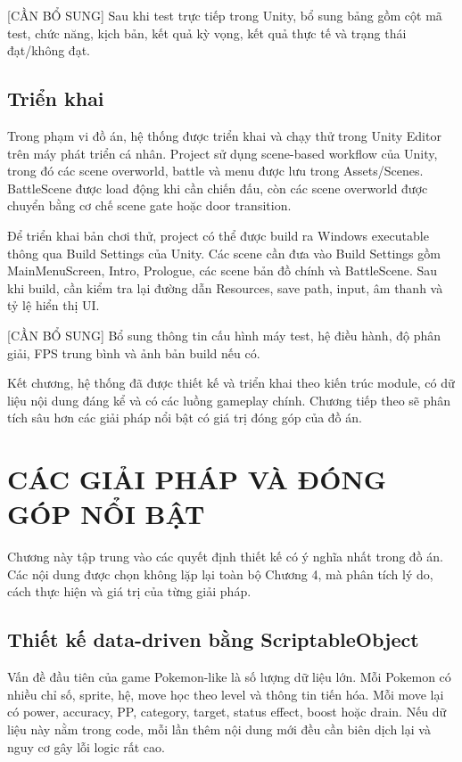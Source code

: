 [CẦN BỔ SUNG] Sau khi test trực tiếp trong Unity, bổ sung bảng gồm cột mã test, chức năng, kịch bản, kết quả kỳ vọng, kết quả thực tế và trạng thái đạt/không đạt.

\section{Triển khai}

Trong phạm vi đồ án, hệ thống được triển khai và chạy thử trong Unity Editor trên máy phát triển cá nhân. Project sử dụng scene-based workflow của Unity, trong đó các scene overworld, battle và menu được lưu trong Assets/Scenes. BattleScene được load động khi cần chiến đấu, còn các scene overworld được chuyển bằng cơ chế scene gate hoặc door transition.

Để triển khai bản chơi thử, project có thể được build ra Windows executable thông qua Build Settings của Unity. Các scene cần đưa vào Build Settings gồm MainMenuScreen, Intro, Prologue, các scene bản đồ chính và BattleScene. Sau khi build, cần kiểm tra lại đường dẫn Resources, save path, input, âm thanh và tỷ lệ hiển thị UI.

[CẦN BỔ SUNG] Bổ sung thông tin cấu hình máy test, hệ điều hành, độ phân giải, FPS trung bình và ảnh bản build nếu có.

Kết chương, hệ thống đã được thiết kế và triển khai theo kiến trúc module, có dữ liệu nội dung đáng kể và có các luồng gameplay chính. Chương tiếp theo sẽ phân tích sâu hơn các giải pháp nổi bật có giá trị đóng góp của đồ án.

\chapter{CÁC GIẢI PHÁP VÀ ĐÓNG GÓP NỔI BẬT}

Chương này tập trung vào các quyết định thiết kế có ý nghĩa nhất trong đồ án. Các nội dung được chọn không lặp lại toàn bộ Chương 4, mà phân tích lý do, cách thực hiện và giá trị của từng giải pháp.

\section{Thiết kế data-driven bằng ScriptableObject}

Vấn đề đầu tiên của game Pokemon-like là số lượng dữ liệu lớn. Mỗi Pokemon có nhiều chỉ số, sprite, hệ, move học theo level và thông tin tiến hóa. Mỗi move lại có power, accuracy, PP, category, target, status effect, boost hoặc drain. Nếu dữ liệu này nằm trong code, mỗi lần thêm nội dung mới đều cần biên dịch lại và nguy cơ gây lỗi logic rất cao.

